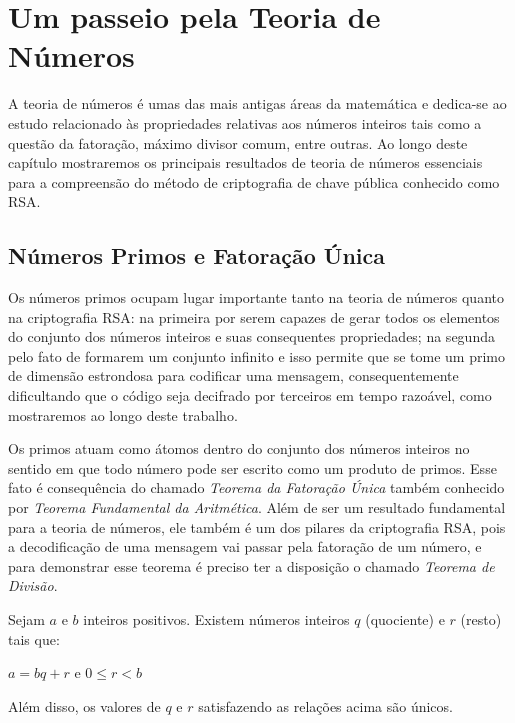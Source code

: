 \pagestyle{fancy}
\fancyhead[R]{\thepage}
\fancyfoot[C]{}


\chapter{Um passeio pela Teoria de N\'umeros}
\label{Num}

A teoria de n\'umeros \'e umas das mais antigas \'areas da matem\'atica e dedica-se ao estudo relacionado \`as propriedades relativas aos n\'umeros inteiros tais como a quest\~ao da fatora\c{c}\~ao, m\'aximo divisor comum, entre outras. Ao longo deste cap\'itulo mostraremos os principais resultados de teoria de n\'umeros essenciais para a compreens\~ao do m\'etodo de criptografia de chave p\'ublica conhecido como RSA.

\section{N\'umeros Primos e Fatora\c{c}\~ao \'Unica}

Os n\'umeros primos ocupam lugar importante tanto na teoria de n\'umeros quanto na criptografia RSA: na primeira por serem capazes de gerar todos os elementos do conjunto dos n\'umeros inteiros e suas consequentes propriedades; na segunda pelo fato de formarem um conjunto infinito e isso permite que se tome um primo de dimens\~ao estrondosa para codificar uma mensagem, consequentemente dificultando que o c\'odigo seja decifrado por terceiros em tempo razo\'avel, como mostraremos ao longo deste trabalho.

Os primos atuam como \'atomos dentro do conjunto dos n\'umeros inteiros no sentido em que todo n\'umero pode ser escrito como um produto de primos. Esse fato \'e consequ\^encia do chamado \textit{Teorema da Fatora\c{c}\~ao \'Unica} tamb\'em conhecido por \textit{Teorema Fundamental da Aritm\'etica}. Al\'em de ser um resultado fundamental para a teoria de n\'umeros, ele tamb\'em \'e um dos pilares da criptografia RSA, pois a decodifica\c{c}\~ao de uma mensagem vai passar pela fatora\c{c}\~ao de um n\'umero, e para demonstrar esse teorema \'e preciso ter a disposi\c{c}\~ao o chamado \textit{Teorema de Divis\~ao}. 


\begin{Th}
\label{teo.div}
Sejam $a$ e $b$ inteiros positivos. Existem n\'umeros inteiros $q$ (quociente) e $r$ (resto) tais que:	
	\begin{center}
		$a=bq+r$ e $0\leq r <b$
	\end{center}
Al\'em disso, os valores de $q$ e $r$ satisfazendo as rela\c{c}\~oes acima s\~ao \'unicos.
\end{Th} 

